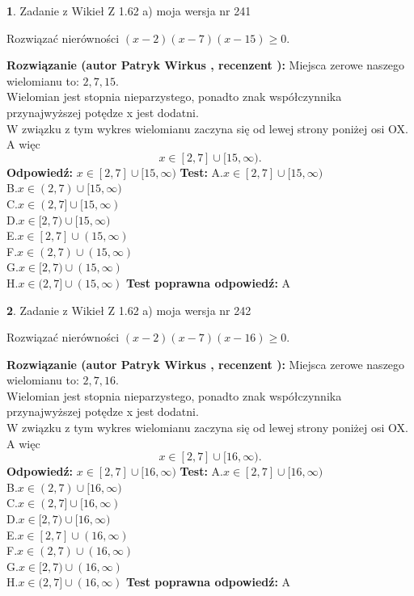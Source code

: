 \documentclass[12pt, a4paper]{article}
\theoremstyle{definition} %
\newtheorem{zad}{}
\newcommand{\zadStart}[1]{\begin{zad}#1\newline}
\newcommand{\zadStop}{\end{zad}}
\newcommand{\rozwStart}[2]{\noindent \textbf{Rozwiązanie (autor #1 , recenzent #2): }\newline}
\newcommand{\rozwStop}{\newline}
\newcommand{\odpStart}{\noindent \textbf{Odpowiedź:}\newline}
\newcommand{\odpStop}{\newline}
\newcommand{\testStart}{\noindent \textbf{Test:}\newline}
\newcommand{\testStop}{\newline}
\newcommand{\kluczStart}{\noindent \textbf{Test poprawna odpowiedź:}\newline}
\newcommand{\kluczStop}{\newline}
\begin{document}
\zadStart{Zadanie z Wikieł Z 1.62 a) moja wersja nr 241}

Rozwiązać nierówności $(x-2)(x-7)(x-15)\ge0$.
\zadStop
\rozwStart{Patryk Wirkus}{}
Miejsca zerowe naszego wielomianu to: $2, 7, 15$.\\
Wielomian jest stopnia nieparzystego, ponadto znak współczynnika przy\linebreak najwyższej potędze x jest dodatni.\\ W związku z tym wykres wielomianu zaczyna się od lewej strony poniżej osi OX. A więc $$x \in [2,7] \cup [15,\infty).$$
\rozwStop
\odpStart
$x \in [2,7] \cup [15,\infty)$
\odpStop
\testStart
A.$x \in [2,7] \cup [15,\infty)$\\
B.$x \in (2,7) \cup [15,\infty)$\\
C.$x \in (2,7] \cup [15,\infty)$\\
D.$x \in [2,7) \cup [15,\infty)$\\
E.$x \in [2,7] \cup (15,\infty)$\\
F.$x \in (2,7) \cup (15,\infty)$\\
G.$x \in [2,7) \cup (15,\infty)$\\
H.$x \in (2,7] \cup (15,\infty)$
\testStop
\kluczStart
A
\kluczStop



\zadStart{Zadanie z Wikieł Z 1.62 a) moja wersja nr 242}

Rozwiązać nierówności $(x-2)(x-7)(x-16)\ge0$.
\zadStop
\rozwStart{Patryk Wirkus}{}
Miejsca zerowe naszego wielomianu to: $2, 7, 16$.\\
Wielomian jest stopnia nieparzystego, ponadto znak współczynnika przy\linebreak najwyższej potędze x jest dodatni.\\ W związku z tym wykres wielomianu zaczyna się od lewej strony poniżej osi OX. A więc $$x \in [2,7] \cup [16,\infty).$$
\rozwStop
\odpStart
$x \in [2,7] \cup [16,\infty)$
\odpStop
\testStart
A.$x \in [2,7] \cup [16,\infty)$\\
B.$x \in (2,7) \cup [16,\infty)$\\
C.$x \in (2,7] \cup [16,\infty)$\\
D.$x \in [2,7) \cup [16,\infty)$\\
E.$x \in [2,7] \cup (16,\infty)$\\
F.$x \in (2,7) \cup (16,\infty)$\\
G.$x \in [2,7) \cup (16,\infty)$\\
H.$x \in (2,7] \cup (16,\infty)$
\testStop
\kluczStart
A
\kluczStop
\end{document}
